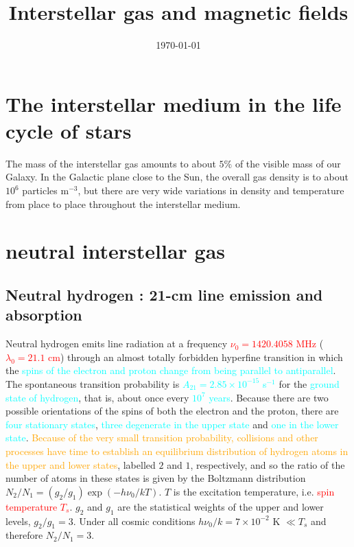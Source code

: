 \documentclass[12pt,a4paper]{article}
\title{Interstellar gas and magnetic  fields}
\author{}
\date{\today}
\begin{document}
\maketitle

\section{The interstellar medium in the life cycle of stars}
The mass of the interstellar gas amounts to about $5\%$ of the visible mass of our Galaxy. In the Galactic plane close to the Sun, the overall gas density is to about $10^6$ particles m$^{-3}$, but there are very wide variations in density and temperature from place to place throughout the interstellar medium.

\section{neutral interstellar gas}

\subsection{Neutral hydrogen : 21-cm line emission and absorption}
Neutral hydrogen emits line radiation at a frequency \textcolor{red}{$\nu_0 = 1420.4058$ MHz} (\textcolor{red}{$\lambda_0 = 21.1$ cm}) through an almost totally forbidden hyperfine transition in which the \textcolor{cyan}{spins of the electron and proton change from being parallel to antiparallel}. The spontaneous transition probability is \textcolor{cyan}{$A_{21} = 2.85 \times 10^{-15}$ s$^{-1}$} for the \textcolor{cyan}{ground state of hydrogen}, that is, about once every \textcolor{cyan}{$10^7$ years}. Because there are two possible orientations of the spins of both the electron and the proton, there are \textcolor{cyan}{four stationary states}, \textcolor{cyan}{three degenerate in the upper state} and \textcolor{cyan}{one in the lower state}. \textcolor{orange}{Because of the very small transition probability, collisions and other processes have time to establish an equilibrium distribution of hydrogen atoms in the upper and lower states}, labelled $2$ and $1$, respectively, and so the ratio of the number of atoms in these states is given by the Boltzmann distribution $N_2/N_1 = (g_2/g_1) \exp(−h\nu_0/kT)$. $T$ is the excitation temperature, i.e. \textcolor{red}{spin temperature $T_s$}. $g_2$ and $g_1$ are the statistical weights of the upper and lower levels, $g_2/g_1 = 3$. Under all cosmic conditions $h\nu_0/k = 7 \times 10^{-2}$ K $\ll T_s$ and therefore $N_2/N_1 = 3$.
\end{document}
